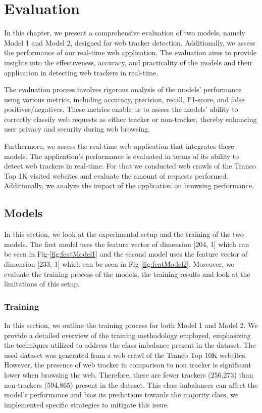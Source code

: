 \chapter{Evaluation}
\label{cha:evaluation}
In this chapter, we present a comprehensive evaluation of two models, namely Model 1 and Model 2, designed for web tracker detection.
Additionally, we assess the performance of our real-time web application. The evaluation aims to provide insights into the effectiveness,
accuracy, and practicality of the models and their application in detecting web trackers in real-time.

The evaluation process involves rigorous analysis of the models' performance using various metrics, including accuracy, precision,
recall, F1-score, and false positives/negatives. These metrics enable us to assess the models' ability to correctly classify web
requests as either tracker or non-tracker, thereby enhancing user privacy and security during web browsing.

Furthermore, we assess the real-time web application that integrates these models. The application's performance is evaluated in
terms of its ability to detect web trackers in real-time. For that we conducted web crawls of the Tranco Top 1K visited websites
and evaluate the amount of requests performed. Additionally, we analyze the impact of the application on browsing performance.
\section{Models}
In this section, we look at the experimental setup and the training of the two models. The first model uses the feature vector of dimension [204, 1] 
which can be seen in Fig-\ref{fig:featModel1} and the second model uses the feature vector of dimension [233, 1]
which can be seen in Fig-\ref{fig:featModel2}. Moreover, we evaluate the training process of the models, the training results and look
at the limitations of this setup.

\subsection{Training}
In this section, we outline the training process for both Model 1 and Model 2.
We provide a detailed overview of the training methodology employed, emphasizing the techniques utilized to address
the class imbalance present in the dataset. The used dataset was generated from a web crawl of the Tranco Top 10K websites. 
However, the presence of web tracker in comparison to non tracker is significant lower when browsing the web. Therefore,
there are fewer trackers (256,273) than non-trackers (594,865) present in the dataset. This class imbalances can affect the
model's performance and bias its predictions towards the majority class, we implemented specific strategies to mitigate this issue.

